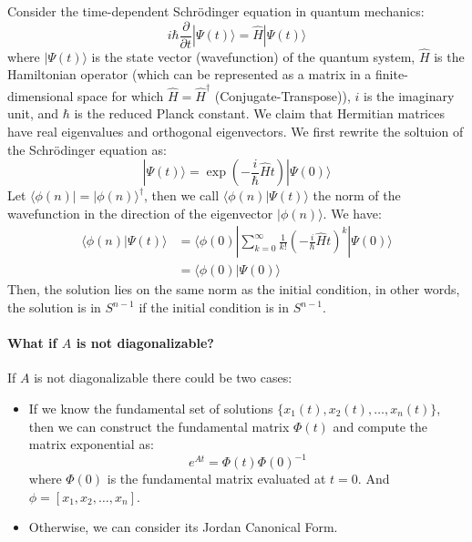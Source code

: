 \documentclass[11pt]{article}
\begin{document}
\begin{example}
    Consider the time-dependent Schrödinger equation in quantum mechanics:
    $$i\hbar \frac{\partial}{\partial t} | \Psi(t) \rangle = \hat{H} | \Psi(t) \rangle$$
    where \( | \Psi(t) \rangle \) is the state vector (wavefunction) of the quantum system, \( \hat{H} \) is the Hamiltonian operator (which can be represented as a matrix in a finite-dimensional space for which \( \hat{H} = \hat{H}^\dagger \) (Conjugate-Transpose)), \( i \) is the imaginary unit, and \( \hbar \) is the reduced Planck constant. We claim that Hermitian matrices have real eigenvalues and orthogonal eigenvectors. We first rewrite the soltuion of the Schrödinger equation as:
    $$
        | \Psi(t) \rangle = \exp \left(-\frac{i}{\hbar} \hat{H} t \right) | \Psi(0) \rangle
    $$
    Let $\langle \phi(n) | = | \phi(n) \rangle^\dagger$, then we call $\langle \phi(n) | \Psi(t) \rangle$ the norm of the wavefunction in the direction of the eigenvector \( | \phi(n) \rangle \). We have:
    \begin{align*}
        \langle \phi(n) | \Psi(t) \rangle
        &= \langle \phi(0) | \sum_{k=0}^{\infty} \frac{1}{k!} \left(-\frac{i}{\hbar} \hat{H} t \right)^k | \Psi(0) \rangle \\  
        &= \langle \phi(0) | \Psi(0) \rangle
    \end{align*}
    Then, the solution lies on the same norm as the initial condition, in other words, the solution is in $S^{n-1}$ if the initial condition is in $S^{n-1}$.
\end{example}

\paragraph{What if \( A \) is not diagonalizable?} If \( A \) is not diagonalizable there could be two cases:
\begin{itemize}
    \item If we know the fundamental set of solutions \( \{x_1(t), x_2(t), \ldots, x_n(t)\} \), then we can construct the fundamental matrix \( \Phi(t) \) and compute the matrix exponential as:
    \begin{equation}
    e^{At} = \Phi(t)\Phi(0)^{-1}
    \end{equation}
    where \( \Phi(0) \) is the fundamental matrix evaluated at \( t = 0 \). And $\phi = [x_1, x_2, \ldots, x_n]$.
    \item Otherwise, we can consider its Jordan Canonical Form.
\end{itemize}
\end{document}
